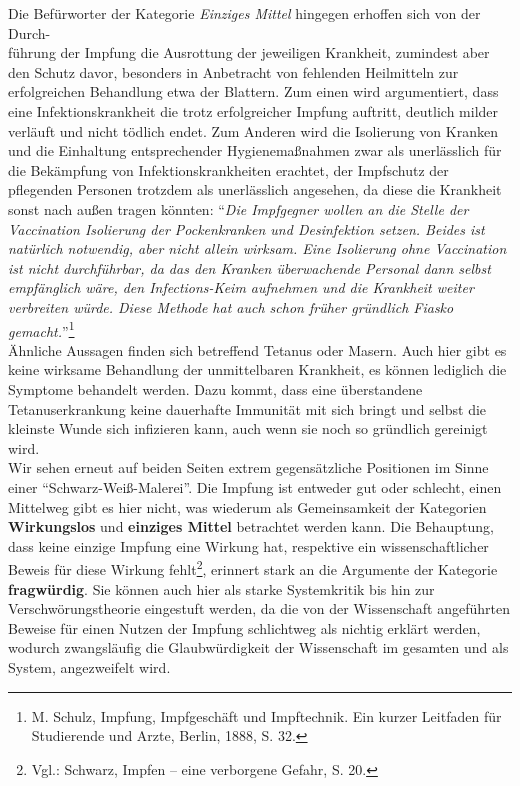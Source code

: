 \documentclass[
    a4paper,
    12pt,
    hyphens,
    chapterprefix=true,
    headheight=33pt,
    footheight=29pt,
    headings=optiontohead, %
]{scrartcl}
\begin{document}
{Die Befürworter der Kategorie \textit{Einziges Mittel} hingegen erhoffen sich von der Durch-\\führung der Impfung die Ausrottung der jeweiligen Krankheit, zumindest aber den Schutz davor, besonders in Anbetracht von fehlenden Heilmitteln zur erfolgreichen Behandlung etwa der Blattern. Zum einen wird argumentiert, dass eine Infektionskrankheit die trotz erfolgreicher Impfung auftritt, deutlich milder verläuft und nicht tödlich endet. Zum Anderen wird die Isolierung von Kranken und die Einhaltung entsprechender Hygienemaßnahmen zwar als unerlässlich für die Bekämpfung von Infektionskrankheiten erachtet, der Impfschutz der pflegenden Personen trotzdem als unerlässlich angesehen, da diese die Krankheit sonst nach außen tragen könnten: "`\textit{Die Impfgegner wollen an die Stelle der Vaccination Isolierung der Pockenkranken und Desinfektion setzen. Beides ist natürlich notwendig, aber nicht allein wirksam. Eine Isolierung ohne Vaccination ist nicht durchführbar, da das den Kranken überwachende Personal dann selbst empfänglich wäre, den Infections-Keim aufnehmen und die Krankheit weiter verbreiten würde. Diese Methode hat auch schon früher gründlich Fiasko gemacht.}"'\footnote{M. Schulz, Impfung, Impfgeschäft und Impftechnik. Ein kurzer Leitfaden für Studierende und Arzte, Berlin, 1888, S. 32.}\\
Ähnliche Aussagen finden sich betreffend Tetanus oder Masern. Auch hier gibt es keine wirksame Behandlung der unmittelbaren Krankheit, es können lediglich die Symptome behandelt werden. Dazu kommt, dass eine überstandene Tetanuserkrankung keine dauerhafte Immunität mit sich bringt und selbst die kleinste Wunde sich infizieren kann, auch wenn sie noch so gründlich gereinigt wird.\\
Wir sehen erneut auf beiden Seiten extrem gegensätzliche Positionen im Sinne einer "`Schwarz-Weiß-Malerei"'. Die Impfung ist entweder gut oder schlecht, einen Mittelweg gibt es hier nicht, was wiederum als Gemeinsamkeit der Kategorien \textbf{Wirkungslos} und \textbf{einziges Mittel} betrachtet werden kann. Die Behauptung, dass keine einzige Impfung eine Wirkung hat, respektive ein wissenschaftlicher Beweis für diese Wirkung fehlt\footnote{Vgl.: Schwarz, Impfen -- eine verborgene Gefahr, S. 20.}, erinnert stark an die Argumente der Kategorie \textbf{fragwürdig}. Sie können auch hier als starke Systemkritik bis hin zur Verschwörungstheorie eingestuft werden, da die von der Wissenschaft angeführten Beweise für einen Nutzen der Impfung schlichtweg als nichtig erklärt werden, wodurch zwangsläufig die Glaubwürdigkeit der Wissenschaft im gesamten und als System, angezweifelt wird. 



}
\end{document}
